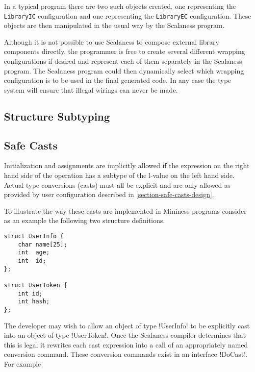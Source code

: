 In a typical program there are two such objects created, one representing the
\lstinline!LibraryIC! configuration and one representing the \lstinline!LibraryEC!
configuration. These objects are then manipulated in the usual way by the Scalaness program.

Although it is not possible to use Scalaness to compose external library components directly,
the programmer is free to create several different wrapping configurations if desired and
represent each of them separately in the Scalaness program. The Scalaness program could then
dynamically select which wrapping configuration is to be used in the final generated code. In
any case the type system will ensure that illegal wirings can never be made.

\subsection{Structure Subtyping}
\label{section-structure-subtyping-implementation}


\subsection{Safe Casts}
\label{section-safe-casts-implementation}

Initialization and assignments are implicitly allowed if the expression on the right hand side
of the operation has a subtype of the l-value on the left hand side. Actual type conversions
(casts) must all be explicit and are only allowed as provided by user configuration described in
\autoref{section-safe-casts-design}.

To illustrate the way these casts are implemented in Mininess programs consider as an example
the following two structure definitions.

\singlespace
\begin{lstlisting}[language=nesC]
struct UserInfo {
    char name[25];
    int  age;
    int  id;
};

struct UserToken {
    int id;
    int hash;
};
\end{lstlisting}
\primaryspacing

The developer may wish to allow an object of type !UserInfo! to be explicitly cast into an
object of type !UserToken!. Once the Scalaness compiler determines that this is legal it
rewrites each cast expression into a call of an appropriately named conversion command. These
conversion commands exist in an interface !DoCast!. For example

